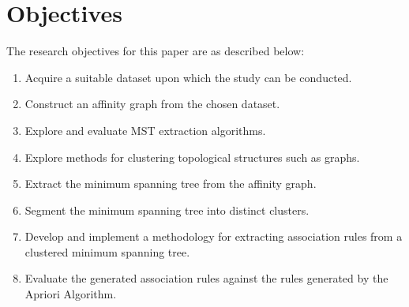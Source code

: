 \section{Objectives}
The research objectives for this paper are as described below:
\begin{enumerate}
\item Acquire a suitable dataset upon which the study can be conducted.
\item Construct an affinity graph from the chosen dataset.
\item Explore and evaluate MST extraction algorithms.
\item Explore methods for clustering topological structures such as graphs.
\item Extract the minimum spanning tree from the affinity graph.
\item Segment the minimum spanning tree into distinct clusters.
\item Develop and implement a methodology for extracting association rules from a clustered minimum spanning tree.
\item Evaluate the generated association rules against the rules generated by the Apriori Algorithm.
\end{enumerate}